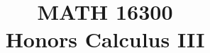 \documentclass[a4paper, 11pt]{article}
\title{MATH 16300 \\ \Large Honors Calculus III}
\begin{document}
    \createintro
    
\end{document}
